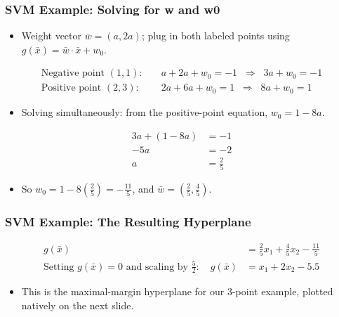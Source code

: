 \begin{frame}[fragile] \frametitle{SVM Example: Solving for w and w0}
\begin{itemize}
\item Weight vector $\bar{w} = (a,2a)$; plug in both labeled points using $g(\bar{x}) = \bar{w}\cdot\bar{x} + w_0$.
\end{itemize}
\begin{align*}
\text{Negative point } (1,1): \quad & a + 2a + w_0 = -1 \;\; \Rightarrow \;\; 3a + w_0 = -1\\
\text{Positive point } (2,3): \quad & 2a + 6a + w_0 = 1 \;\; \Rightarrow \;\; 8a + w_0 = 1
\end{align*}
\begin{itemize}
\item Solving simultaneously: from the positive-point equation, $w_0 = 1-8a$.
\end{itemize}
\begin{align*}
3a + (1-8a) &= -1 \\
-5a &= -2 \\
a &= \frac{2}{5}
\end{align*}
\begin{itemize}
\item So $w_0 = 1 - 8\left(\frac{2}{5}\right) = -\frac{11}{5}$, and $\bar{w} = \left(\frac{2}{5},\frac{4}{5}\right)$.
\end{itemize}
\end{frame}


\begin{frame}[fragile] \frametitle{SVM Example: The Resulting Hyperplane}
\begin{align*}
g(\bar{x}) &= \frac{2}{5}x_1 + \frac{4}{5}x_2 - \frac{11}{5}\\
\text{Setting } g(\bar{x})=0 \text{ and scaling by } \frac{5}{2}: \quad g(\bar{x}) &= x_1 + 2x_2 - 5.5
\end{align*}
\begin{itemize}
\item This is the maximal-margin hyperplane for our 3-point example, plotted natively on the next slide.
\end{itemize}
\end{frame}

